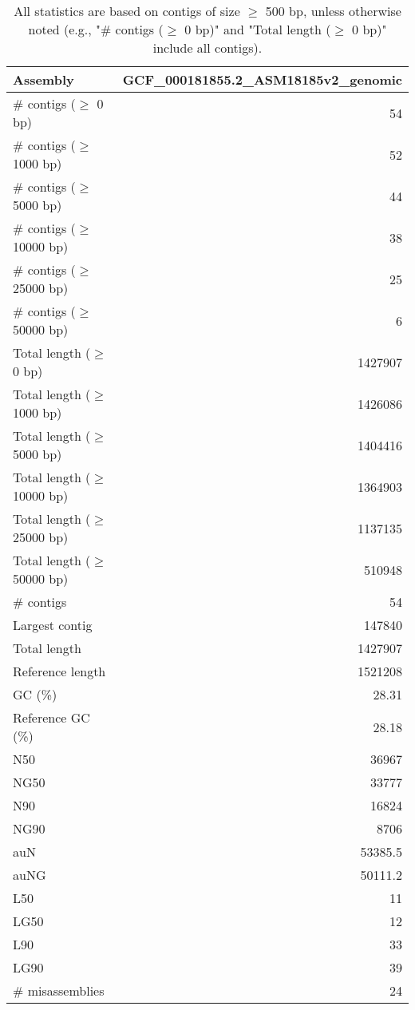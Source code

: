 \documentclass[12pt,a4paper]{article}
\begin{document}
\begin{table}[ht]
\begin{center}
\caption{All statistics are based on contigs of size $\geq$ 500 bp, unless otherwise noted (e.g., "\# contigs ($\geq$ 0 bp)" and "Total length ($\geq$ 0 bp)" include all contigs).}
\begin{tabular}{|l*{1}{|r}|}
\hline
Assembly & GCF\_000181855.2\_ASM18185v2\_genomic \\ \hline
\# contigs ($\geq$ 0 bp) & 54 \\ \hline
\# contigs ($\geq$ 1000 bp) & 52 \\ \hline
\# contigs ($\geq$ 5000 bp) & 44 \\ \hline
\# contigs ($\geq$ 10000 bp) & 38 \\ \hline
\# contigs ($\geq$ 25000 bp) & 25 \\ \hline
\# contigs ($\geq$ 50000 bp) & 6 \\ \hline
Total length ($\geq$ 0 bp) & 1427907 \\ \hline
Total length ($\geq$ 1000 bp) & 1426086 \\ \hline
Total length ($\geq$ 5000 bp) & 1404416 \\ \hline
Total length ($\geq$ 10000 bp) & 1364903 \\ \hline
Total length ($\geq$ 25000 bp) & 1137135 \\ \hline
Total length ($\geq$ 50000 bp) & 510948 \\ \hline
\# contigs & 54 \\ \hline
Largest contig & 147840 \\ \hline
Total length & 1427907 \\ \hline
Reference length & 1521208 \\ \hline
GC (\%) & 28.31 \\ \hline
Reference GC (\%) & 28.18 \\ \hline
N50 & 36967 \\ \hline
NG50 & 33777 \\ \hline
N90 & 16824 \\ \hline
NG90 & 8706 \\ \hline
auN & 53385.5 \\ \hline
auNG & 50111.2 \\ \hline
L50 & 11 \\ \hline
LG50 & 12 \\ \hline
L90 & 33 \\ \hline
LG90 & 39 \\ \hline
\# misassemblies & 24 \\ \hline

\end{tabular}
\end{center}
\end{table}
\end{document}

